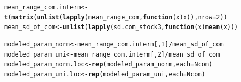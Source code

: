 \documentclass[12pt]{article}\usepackage[]{graphicx}\usepackage[]{color}
\makeatletter
\newcommand{\hlnum}[1]{\textcolor[rgb]{0.686,0.059,0.569}{#1}}%
\newcommand{\hlopt}[1]{\textcolor[rgb]{0,0,0}{#1}}%
\newcommand{\hlstd}[1]{\textcolor[rgb]{0.345,0.345,0.345}{#1}}%
\newcommand{\hlkwa}[1]{\textcolor[rgb]{0.161,0.373,0.58}{\textbf{#1}}}%
\newcommand{\hlkwb}[1]{\textcolor[rgb]{0.69,0.353,0.396}{#1}}%
\newcommand{\hlkwc}[1]{\textcolor[rgb]{0.333,0.667,0.333}{#1}}%
\newcommand{\hlkwd}[1]{\textcolor[rgb]{0.737,0.353,0.396}{\textbf{#1}}}%
\newenvironment{kframe}{%
 \def\at@end@of@kframe{}%
 \ifinner\ifhmode%
  \def\at@end@of@kframe{\end{minipage}}%
  \begin{minipage}{\columnwidth}%
 \fi\fi%
 \def\FrameCommand##1{\hskip\@totalleftmargin \hskip-\fboxsep
 \colorbox{shadecolor}{##1}\hskip-\fboxsep
     \hskip-\linewidth \hskip-\@totalleftmargin \hskip\columnwidth}%
 \MakeFramed {\advance\hsize-\width
   \@totalleftmargin\z@ \linewidth\hsize
   \@setminipage}}%
 {\par\unskip\endMakeFramed%
 \at@end@of@kframe}
\newenvironment{knitrout}{}{} %
\makeatother
\begin{document}
\begin{knitrout}\small
{}\color{fgcolor}\begin{kframe}
\begin{alltt}
\hlstd{mean_range_com.interm} \hlkwb{<-} \hlkwd{t}\hlstd{(}\hlkwd{matrix}\hlstd{(}\hlkwd{unlist}\hlstd{(}\hlkwd{lapply}\hlstd{(mean_range_com,} \hlkwa{function}\hlstd{(}\hlkwc{x}\hlstd{) x)),} \hlkwc{nrow} \hlstd{=} \hlnum{2}\hlstd{))}
\hlstd{mean_sd_of_com} \hlkwb{<-} \hlkwd{unlist}\hlstd{(}\hlkwd{lapply}\hlstd{(sd.com_stock3,} \hlkwa{function}\hlstd{(}\hlkwc{x}\hlstd{)} \hlkwd{mean}\hlstd{(x)))}

\hlstd{modeled_param_norm} \hlkwb{<-} \hlstd{mean_range_com.interm[,} \hlnum{1}\hlstd{]} \hlopt{/} \hlstd{mean_sd_of_com}
\hlstd{modeled_param_uni} \hlkwb{<-} \hlstd{mean_range_com.interm[,} \hlnum{2}\hlstd{]} \hlopt{/} \hlstd{mean_sd_of_com}
\hlstd{modeled_param_norm.loc} \hlkwb{<-} \hlkwd{rep}\hlstd{(modeled_param_norm,} \hlkwc{each} \hlstd{= Ncom)}
\hlstd{modeled_param_uni.loc} \hlkwb{<-} \hlkwd{rep}\hlstd{(modeled_param_uni,} \hlkwc{each} \hlstd{= Ncom)}
\end{alltt}
\end{kframe}
\end{knitrout}
\end{document}
